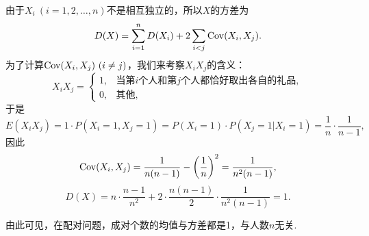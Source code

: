 \begin{example}[配对问题]
\begin{solution}
由于\(X_i\ (i=1,2,\dotsc,n)\)不是相互独立的，所以\(X\)的方差为\begin{equation*}
    D(X) = \sum_{i=1}^n D(X_i) + 2 \sum_{i<j} \operatorname{Cov}(X_i,X_j).
\end{equation*}
为了计算\(\operatorname{Cov}(X_i,X_j)\ (i \neq j)\)，我们来考察\(X_i X_j\)的含义：\begin{equation*}
    X_i X_j = \left\{ \begin{array}{ll}
    1, & \text{当第\(i\)个人和第\(j\)个人都恰好取出各自的礼品}, \\
    0, & \text{其他},
    \end{array} \right.
\end{equation*}于是\begin{equation*}
    E(X_i X_j) = 1 \cdot P(X_i=1,X_j=1)
    = P(X_i=1) \cdot P(X_j=1 \vert X_i=1)
    = \frac{1}{n} \cdot \frac{1}{n-1},
\end{equation*}
因此\begin{equation*}
    \operatorname{Cov}(X_i,X_j) = \frac{1}{n(n-1)} - \left(\frac{1}{n}\right)^2
    = \frac{1}{n^2(n-1)},
\end{equation*}\begin{equation*}
    D(X) = n \cdot \frac{n-1}{n^2} + 2 \cdot \frac{n(n-1)}{2} \cdot \frac{1}{n^2(n-1)}
    = 1.
\end{equation*}
\end{solution}
由此可见，在配对问题，成对个数的均值与方差都是1，与人数\(n\)无关.
\end{example}

